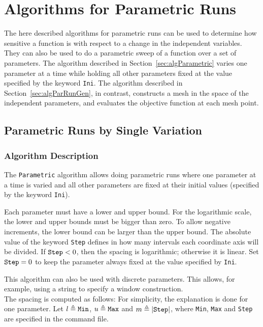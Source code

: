 \chapter{Algorithms for Parametric Runs}
\label{sec:algParRun}

The here described algorithms for 
parametric runs can be used to determine how sensitive a function is 
with respect to a change in the independent variables.
They can also be used to do a parametric
sweep of a function over a set of parameters.
The algorithm described in Section~\ref{sec:algParametric} varies one parameter at a time while holding all other parameters fixed at the value 
specified by the keyword \texttt{Ini}. The algorithm described in Section~\ref{sec:algParRunGen}, in contrast, constructs a mesh in the space of the independent parameters, and evaluates the objective function at each mesh point.

\section{Parametric Runs by Single Variation}
\subsection{Algorithm Description}

The \texttt{Parametric} algorithm allows doing parametric runs where
one parameter at a time is varied and
all other parameters are fixed at their initial values
(specified by the keyword \texttt{Ini}).

Each parameter must have a lower and upper bound.
For the logarithmic scale, the lower and upper bounds must be bigger than zero.
To allow negative increments, the lower bound can be larger than the upper bound.
The absolute value of the keyword \texttt{Step} defines in how many intervals 
each coordinate axis will be divided.
If $\text{\texttt{Step}} < 0$, then the spacing is logarithmic; otherwise it is linear. Set $\text{\texttt{Step}} = 0$ to keep the parameter always fixed at the value
specified by \texttt{Ini}.

This algorithm can also be used with discrete parameters. This allows, for example, using a string to specify a window construction.
\\


The spacing is computed as follows:
For simplicity, the explanation is done for one parameter.
Let $l \triangleq \text{\texttt{Min}}$, $u \triangleq \text{\texttt{Max}}$ and $m \triangleq |\text{\texttt{Step}}|$,
where \texttt{Min}, \texttt{Max} and \texttt{Step} are specified in the command file.\\

